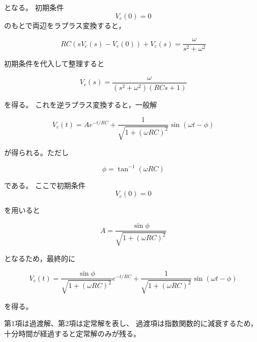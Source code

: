 \documentclass{jarticle}
\begin{document}
となる。
初期条件
\[
V_c(0)=0
\]
のもとで両辺をラプラス変換すると，

\[
RC(sV_c(s)-V_c(0))+V_c(s)
=
\frac{\omega}{s^2+\omega^2}
\]

初期条件を代入して整理すると

\[
V_c(s)
=
\frac{\omega}{(s^2+\omega^2)(RCs+1)}
\]

を得る。
これを逆ラプラス変換すると，一般解

\[
V_c(t)
=
Ae^{-t/RC}
+
\frac{1}{\sqrt{1+(\omega RC)^2}}
\sin(\omega t-\phi)
\]

が得られる。ただし

\[
\phi=\tan^{-1}(\omega RC)
\]

である。
ここで初期条件
\[
V_c(0)=0
\]

を用いると

\[
A=
\frac{\sin\phi}{\sqrt{1+(\omega RC)^2}}
\]

となるため，最終的に

\begin{equation}
    V_c(t)
=
\frac{\sin\phi}{\sqrt{1+(\omega RC)^2}}
e^{-t/RC}
+
\frac{1}{\sqrt{1+(\omega RC)^2}}
\sin(\omega t-\phi)
\end{equation}


を得る。

第1項は過渡解、第2項は定常解を表し、
過渡項は指数関数的に減衰するため，
十分時間が経過すると定常解のみが残る。
\end{document}
